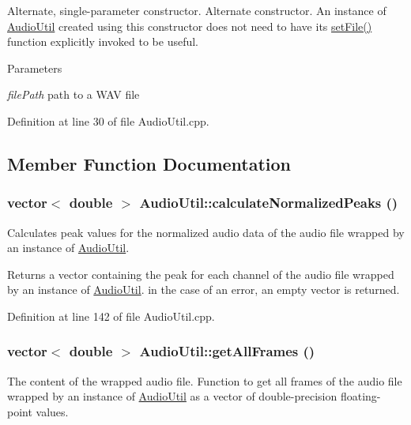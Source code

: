 Alternate, single-\/parameter constructor. Alternate constructor. An instance of \hyperlink{classAudioUtil}{AudioUtil} created using this constructor does not need to have its \hyperlink{classAudioUtil_a5f477f4385a0da16f930d627dc168723}{setFile()} function explicitly invoked to be useful.


\begin{DoxyParams}{Parameters}
\item[{\em filePath}]path to a WAV file \end{DoxyParams}


Definition at line 30 of file AudioUtil.cpp.

\subsection{Member Function Documentation}
\hypertarget{classAudioUtil_a13513ca40750bfc2c71e269e1826fadc}{
\subsubsection[{calculateNormalizedPeaks}]{\setlength{\rightskip}{0pt plus 5cm}vector$<$ double $>$ AudioUtil::calculateNormalizedPeaks ()}}
\label{classAudioUtil_a13513ca40750bfc2c71e269e1826fadc}


Calculates peak values for the normalized audio data of the audio file wrapped by an instance of \hyperlink{classAudioUtil}{AudioUtil}. \begin{DoxyReturn}{Returns}
a vector containing the peak for each channel of the audio file wrapped by an instance of \hyperlink{classAudioUtil}{AudioUtil}. in the case of an error, an empty vector is returned. 
\end{DoxyReturn}


Definition at line 142 of file AudioUtil.cpp.\hypertarget{classAudioUtil_a6cd1c1137a4ab43565ea6275e5dc0eb4}{
\subsubsection[{getAllFrames}]{\setlength{\rightskip}{0pt plus 5cm}vector$<$ double $>$ AudioUtil::getAllFrames ()}}
\label{classAudioUtil_a6cd1c1137a4ab43565ea6275e5dc0eb4}


The content of the wrapped audio file. Function to get all frames of the audio file wrapped by an instance of \hyperlink{classAudioUtil}{AudioUtil} as a vector of double-\/precision floating-\/point values.

